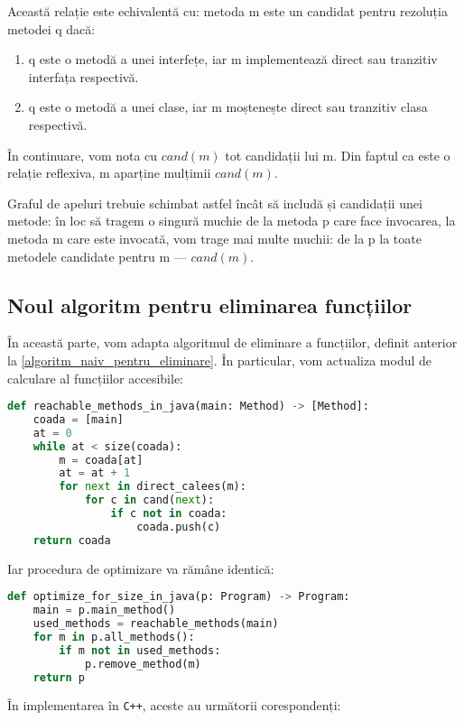 Această relație este echivalentă cu: metoda m este un candidat pentru rezoluția
metodei q dacă:
\begin{enumerate}
    \item q este o metodă a unei interfețe, iar m implementează direct sau
        tranzitiv interfața respectivă.
    \item q este o metodă a unei clase, iar m moștenește direct sau tranzitiv
        clasa respectivă.
\end{enumerate}

În continuare, vom nota cu $cand(m)$ tot candidații lui m. Din faptul ca este o
relație reflexiva, m aparține mulțimii $cand(m)$.

Graful de apeluri trebuie schimbat astfel încât să includă și candidații unei
metode: în loc să tragem o singură muchie de la metoda p care face invocarea, la
metoda m care este invocată, vom trage mai multe muchii: de la p la toate
metodele candidate pentru m --- $cand(m)$.

\subsection{Noul algoritm pentru eliminarea funcțiilor}

În această parte, vom adapta algoritmul de eliminare a funcțiilor, definit
anterior la \ref{algoritm_naiv_pentru_eliminare}.
În particular, vom actualiza modul de calculare al funcțiilor accesibile:

\begin{lstlisting}[language=Python]
def reachable_methods_in_java(main: Method) -> [Method]:
    coada = [main]
    at = 0
    while at < size(coada):
        m = coada[at]
        at = at + 1
        for next in direct_calees(m):
            for c in cand(next):
                if c not in coada:
                    coada.push(c)
    return coada
\end{lstlisting}


Iar procedura de optimizare va rămâne identică:

\begin{lstlisting}[language=Python]
def optimize_for_size_in_java(p: Program) -> Program:
    main = p.main_method()
    used_methods = reachable_methods(main)
    for m in p.all_methods():
        if m not in used_methods:
            p.remove_method(m)
    return p
\end{lstlisting}


În implementarea în \texttt{C++}, aceste au următorii corespondenți:

